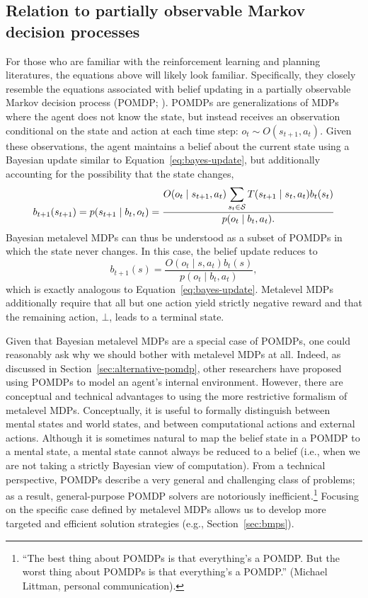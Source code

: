 \subsection{Relation to partially observable Markov decision processes}\label{sec:pomdp}

For those who are familiar with the reinforcement learning and planning literatures, the equations above will likely look familiar. Specifically, they closely resemble the equations associated with belief updating in a partially observable Markov decision process (POMDP; \citealp{kaelbling1998planningb}). POMDPs are generalizations of MDPs where the agent does not know the state, but instead receives an observation conditional on the state and action at each time step: $o_t \sim O(s_{t+1}, a_t)$. Given these observations, the agent maintains a belief about the current state using a Bayesian update similar to Equation~\ref{eq:bayes-update}, but additionally accounting for the possibility that the state changes,
%
\begin{equation}\label{eq:pomdp-update}
  b_{t+1}(s_{t+1}) = p(s_{t+1} \mid b_t, o_t) = \frac{
    O(o_t \mid s_{t+1}, a_t) \displaystyle\sum_{s_t \in \S} T(s_{t+1} \mid s_t, a_t) b_t(s_t)
  }{
    p(o_t \mid b_t, a_t).
  } 
\end{equation}
%
Bayesian metalevel MDPs can thus be understood as a subset of POMDPs in which the state never changes. In this case, the belief update reduces to
\begin{equation}
  b_{t+1}(s) =  
  \frac{O(o_t \mid s, a_t) b_t(s)}{p(o_t \mid b_t, a_t)},
\end{equation}
which is exactly analogous to Equation~\ref{eq:bayes-update}.
Metalevel MDPs additionally require that all but one action yield strictly negative reward and that the remaining action, $\bot$, leads to a terminal state.

Given that Bayesian metalevel MDPs are a special case of POMDPs, one could reasonably ask why we should bother with metalevel MDPs at all. Indeed, as discussed in Section~\ref{sec:alternative-pomdp}, other researchers have proposed using POMDPs to model an agent's internal environment. However, there are conceptual and technical advantages to using the more restrictive formalism of metalevel MDPs. Conceptually, it is useful to formally distinguish between mental states and world states, and between computational actions and external actions. Although it is sometimes natural to map the belief state in a POMDP to a mental state, a mental state cannot always be reduced to a belief (i.e., when we are not taking a strictly Bayesian view of computation). From a technical perspective, POMDPs describe a very general and challenging class of problems; as a result, general-purpose POMDP solvers are notoriously inefficient.\footnote{%
  ``The best thing about POMDPs is that everything's a POMDP. But the worst thing about POMDPs is that everything's a POMDP.'' (Michael Littman, personal communication).
} Focusing on the specific case defined by metalevel MDPs allows us to develop more targeted and efficient solution strategies (e.g., Section~\ref{sec:bmps}). 

